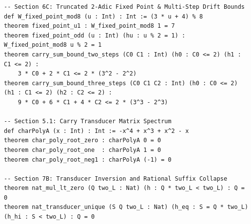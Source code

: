 \documentclass[11pt,reqno]{amsart}
\theoremstyle{definition}
\numberwithin{equation}{section}
\begin{document}
\begin{tiny}
\begin{verbatim}
-- Section 6C: Truncated 2-Adic Fixed Point & Multi-Step Drift Bounds
def W_fixed_point_mod8 (u : Int) : Int := (3 * u + 4) % 8
theorem fixed_point_u1 : W_fixed_point_mod8 1 = 7
theorem fixed_point_odd (u : Int) (hu : u % 2 = 1) : W_fixed_point_mod8 u % 2 = 1
theorem carry_sum_bound_two_steps (C0 C1 : Int) (h0 : C0 <= 2) (h1 : C1 <= 2) :
    3 * C0 + 2 * C1 <= 2 * (3^2 - 2^2)
theorem carry_sum_bound_three_steps (C0 C1 C2 : Int) (h0 : C0 <= 2) (h1 : C1 <= 2) (h2 : C2 <= 2) :
    9 * C0 + 6 * C1 + 4 * C2 <= 2 * (3^3 - 2^3)

-- Section 5.1: Carry Transducer Matrix Spectrum
def charPolyA (x : Int) : Int := -x^4 + x^3 + x^2 - x
theorem char_poly_root_zero : charPolyA 0 = 0
theorem char_poly_root_one  : charPolyA 1 = 0
theorem char_poly_root_neg1 : charPolyA (-1) = 0

-- Section 7B: Transducer Inversion and Rational Suffix Collapse
theorem nat_mul_lt_zero (Q two_L : Nat) (h : Q * two_L < two_L) : Q = 0
theorem nat_transducer_unique (S Q two_L : Nat) (h_eq : S = Q * two_L) (h_hi : S < two_L) : Q = 0
\end{verbatim}
\end{tiny}
\end{document}
